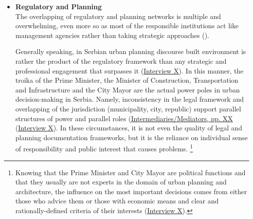 \documentclass[11pt]{report}
\begin{document}
\begin{itemize}
Similar dependence on global trends and circumstances is obvious in growing involvement of foreign investors and investments funds in the real estate in Serbia. The consequences of political treatment of property and discrepancy between planning and implementation during socialism take its toll being still at play through fast-moving, profit-oriented practices under neoliberalism and transition - once built, the structures are more difficult to change, which has been the logic of BWP\footnote{Despite the double rejection for the building permit from the Ministry of Construction, Transportation and Infrastructure, the coastal fortification was finalized during 2016. It is difficult to estimate, but, having two residential towers under construction nearby, it is very unlikely that the coastal fortification will be dismantled and removed, or even adjusted to the local technical requirements.}
(\href{InterviewX}{Interview X}).
\\

\item \textbf{Regulatory and Planning}
\\
The overlapping of regulatory and planning networks is multiple and overwhelming, even more so as most of the responsible institutions act like management agencies rather than taking strategic approaches (\href{ref}{\citealt{vujosevic_collapse_2010}}).

Generally speaking, in Serbian urban planning discourse built environment is rather the product of the regulatory framework than any strategic and professional engagement that surpasses it (\href{InterviewX}{Interview X}).
 In this manner, the troika of the Prime Minister, the Minister of Construction, Transportation and Infrastructure and the City Mayor are the actual power poles in urban decision-making in Serbia. Namely, inconsistency in the legal framework and overlapping of the jurisdiction (municipality, city, republic) support parallel structures of power and parallel roles (\href{ref}{Intermediaries/Mediators, pp. XX} (\href{InterviewX}{Interview X}).
In these circumstances, it is not even the quality of legal and planning documentation frameworks, but it is the reliance on individual sense of responsibility and public interest that causes problems.
\footnote{Knowing that the Prime Minister and City Mayor are political functions and that they usually are not experts in the domain of urban planning and architecture, the influence on the most important decisions comes from either those who advice them or those with economic means and clear and rationally-defined criteria of their interests
(\href{InterviewX}{Interview X}).}


\end{itemize}
\end{document}
